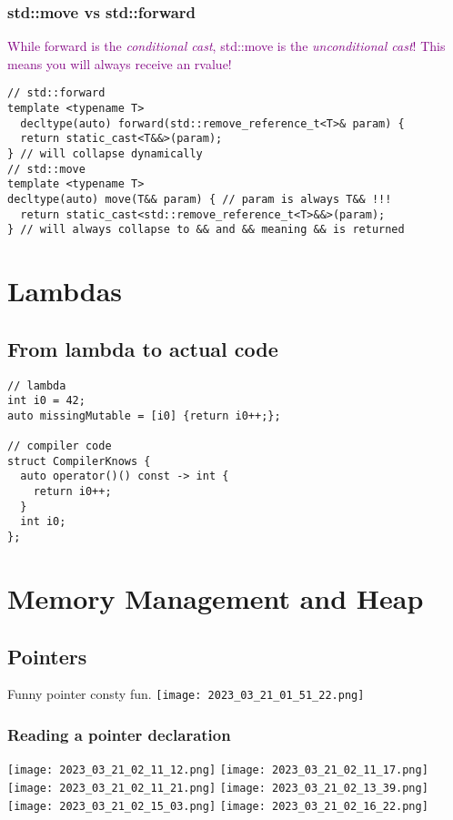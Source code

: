 \documentclass[main.tex,fontsize=8pt,paper=a4,paper=portrait,DIV=calc,]{scrartcl}
\begin{document}
\subsubsection{std::move vs std::forward}
\textcolor{purple}{While forward is the \emph{conditional cast}, std::move is the \emph{unconditional cast}! This means you will always receive an rvalue!}
\begin{lstlisting}
// std::forward
template <typename T>
  decltype(auto) forward(std::remove_reference_t<T>& param) {
  return static_cast<T&&>(param); 
} // will collapse dynamically
// std::move
template <typename T>
decltype(auto) move(T&& param) { // param is always T&& !!!
  return static_cast<std::remove_reference_t<T>&&>(param);
} // will always collapse to && and && meaning && is returned
\end{lstlisting}

\section{Lambdas}

\subsection{From lambda to actual code}
\begin{lstlisting}
// lambda
int i0 = 42;
auto missingMutable = [i0] {return i0++;};

// compiler code
struct CompilerKnows {
  auto operator()() const -> int {
    return i0++;
  }
  int i0;
};
\end{lstlisting}

\section{Memory Management and Heap}

\subsection{Pointers}
Funny pointer consty fun.\newline
\texttt{[image: 2023\_03\_21\_01\_51\_22.png]}

\subsubsection{Reading a pointer declaration}
\texttt{[image: 2023\_03\_21\_02\_11\_12.png]}
\texttt{[image: 2023\_03\_21\_02\_11\_17.png]}
\texttt{[image: 2023\_03\_21\_02\_11\_21.png]}\newline
\texttt{[image: 2023\_03\_21\_02\_13\_39.png]}\newline
\texttt{[image: 2023\_03\_21\_02\_15\_03.png]}
\texttt{[image: 2023\_03\_21\_02\_16\_22.png]}
\end{document}
